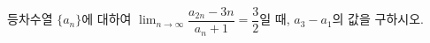 등차수열 $\{a_n\}$에 대하여 $\displaystyle\lim_{n\to\infty}\dfrac{a_{2n}-3n}{a_n+1}=\dfrac{3}{2}$일 때, $a_3-a_1$의 값을 구하시오.
